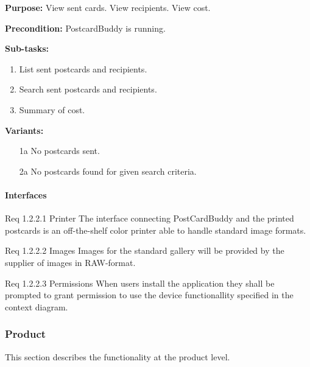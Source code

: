 \documentclass[10pt,a4paper]{article}
\begin{document}
\begin {description}
\begin {description}
\item \textbf{Purpose:} View sent cards. View recipients. View cost.
\item \textbf{Precondition:} PostcardBuddy is running. 

\item \textbf{Sub-tasks:}
\begin{enumerate}
\item List sent postcards and recipients. 
\item Search sent postcards and recipients.
\item Summary of cost.  

\end{enumerate}
\item \textbf{Variants:}
\begin{itemize}[label={}]

\item[1a] No postcards sent. 
\item[2a] No postcards found for given search criteria. 

\end{itemize}
\end{description}
\end{description}



\paragraph{Interfaces}
\begin {description}
\item [Req 1.2.2.1 Printer] The interface connecting PostCardBuddy and the printed postcards is an off-the-shelf color printer able to handle standard image formats.

\item[Req 1.2.2.2 Images] Images for the standard gallery will be provided by the supplier of images in RAW-format.

\item[Req 1.2.2.3 Permissions] When users install the application they shall be prompted to grant permission to use the device functionallity specified in the context diagram.  
\end{description}

\subsubsection{Product}
This section describes the functionality at the product level. 
\end{document}
